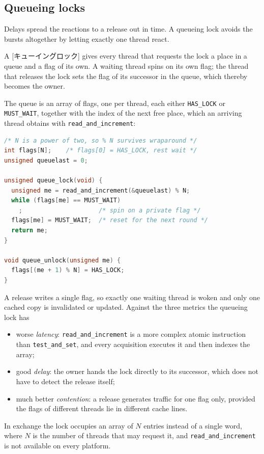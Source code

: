 \documentclass[../main.tex]{subfiles}
\begin{document}
\subsection{Queueing locks}

Delays spread the reactions to a release out in time.  A queueing lock
avoids the bursts altogether by letting exactly one thread react.

\begin{definition}
  A [キューイングロック] gives every thread that
  requests the lock a place in a queue and a flag of its own.  A waiting
  thread spins on its own flag; the thread that releases the lock sets the
  flag of its successor in the queue, which thereby becomes the owner.
\end{definition}

The queue is an array of flags, one per thread, each either
\texttt{HAS\_LOCK} or \texttt{MUST\_WAIT}, together with the index of the
next free place, which an arriving thread obtains with
\texttt{read\_and\_increment}:
\begin{lstlisting}[language=C, numbers=none]
/* N is a power of two, so % N survives wraparound */
int flags[N];    /* flags[0] = HAS_LOCK, rest wait */
unsigned queuelast = 0;

unsigned queue_lock(void) {
  unsigned me = read_and_increment(&queuelast) % N;
  while (flags[me] == MUST_WAIT)
    ;                     /* spin on a private flag */
  flags[me] = MUST_WAIT;  /* reset for the next round */
  return me;
}

void queue_unlock(unsigned me) {
  flags[(me + 1) % N] = HAS_LOCK;
}
\end{lstlisting}
A release writes a single flag, so exactly one waiting thread is woken and
only one cached copy is invalidated or updated.  Against the three metrics
the queueing lock has
\begin{itemize}
  \item worse \emph{latency}: \texttt{read\_and\_increment} is a more
    complex atomic instruction than \texttt{test\_and\_set}, and every
    acquisition executes it and then indexes the array;
  \item good \emph{delay}: the owner hands the lock directly to its
    successor, which does not have to detect the release itself;
  \item much better \emph{contention}: a release generates traffic for one
    flag only, provided the flags of different threads lie in different
    cache lines.
\end{itemize}
In exchange the lock occupies an array of $N$ entries instead of a single
word, where $N$ is the number of threads that may request it, and
\texttt{read\_and\_increment} is not available on every platform.
\end{document}
